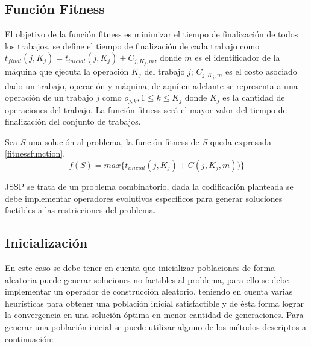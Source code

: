 \documentclass[journal]{IEEEtran}
\begin{document}

\subsection{Función Fitness}
El objetivo de la función fitness es minimizar el tiempo de finalización de todos los trabajos, se define el tiempo de finalización de cada trabajo como $t_{final}(j,K_{j}) = t_{inicial}(j,K_{j})+C_{j,K_{j},m}$, donde $m$ es el identificador de la máquina que ejecuta la operación $K_{j}$ del trabajo $j$; $C_{j,K_{j},m}$ es el costo asociado dado un trabajo, operación y máquina, de aquí en adelante se representa a una operación de un trabajo $j$ como $o_{j,k} , 1\leq k\leq K_{j}$ donde $K_{j}$ es la cantidad de operaciones del trabajo.
La función fitness será el mayor valor del tiempo de finalización del conjunto de trabajos.


Sea $S$ una solución al problema, la función fitness de $S$ queda expresada \eqref{fitnessfunction}.
\begin{equation}
f(S)= max\{t_{inicial}(j, K_{j}) + C(j,K_{j},m))\} 
\label{fitnessfunction}  
\end{equation}

JSSP se trata de un problema combinatorio, dada la codificación planteada se debe implementar operadores evolutivos específicos para generar soluciones factibles a las restricciones del problema.


\subsection{Inicialización}
\label{sec:init}
En este caso se debe tener en cuenta que inicializar poblaciones de forma aleatoria puede generar soluciones no factibles al problema, para ello se debe implementar un operador de construcción aleatorio, teniendo en cuenta varias heurísticas para obtener una población inicial satisfactible y de ésta forma lograr la convergencia en una solución óptima en menor cantidad de generaciones.
Para generar una población inicial se puede utilizar alguno de los métodos descriptos a continuación:
\end{document}
